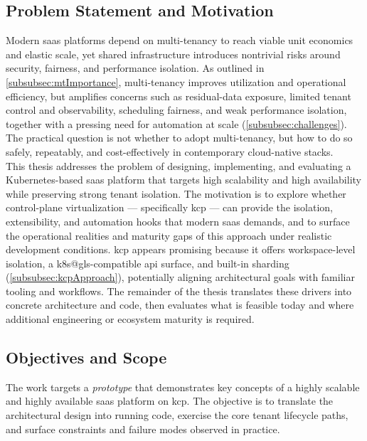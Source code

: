 \documentclass[11pt, a4paper, oneside, listof=totoc]{scrartcl}
\begin{document}
        \subsection{Problem Statement and Motivation}\label{subsec:problem}
            Modern \gls{saas} platforms depend on multi-tenancy to reach viable unit economics and
            elastic scale, yet shared infrastructure introduces nontrivial risks around security,
            fairness, and performance isolation.
            As outlined in \autoref{subsubsec:mtImportance}, multi-tenancy improves utilization and
            operational efficiency, but amplifies concerns such as residual-data exposure,
            limited tenant control and observability, scheduling fairness, and weak performance
            isolation, together with a pressing need for automation at scale
            (\autoref{subsubsec:challenges}).
            The practical question is not whether to adopt multi-tenancy, but how to do so safely,
            repeatably, and cost-effectively in contemporary cloud-native stacks.\\
            This thesis addresses the problem of designing, implementing, and evaluating a
            Kubernetes-based \gls{saas} platform that targets high scalability and high availability
            while preserving strong tenant isolation.
            The motivation is to explore whether control-plane virtualization --- specifically
            \gls{kcp} --- can provide the isolation, extensibility, and automation hooks that modern
            \gls{saas} demands, and to surface the operational realities and maturity gaps of this
            approach under realistic development conditions.
            \gls{kcp} appears promising because it offers workspace-level isolation, a
            \gls{k8s@gls}-compatible \gls{api} surface, and built-in sharding
            (\autoref{subsubsec:kcpApproach}), potentially aligning architectural goals with
            familiar tooling and workflows.
            The remainder of the thesis translates these drivers into concrete architecture and
            code, then evaluates what is feasible today and where additional engineering or
            ecosystem maturity is required.

        \subsection{Objectives and Scope}\label{subsec:objectivesAndScope}
            The work targets a \emph{prototype} that demonstrates key concepts of a highly scalable
            and highly available \gls{saas} platform on \gls{kcp}.
            The objective is to translate the architectural design into running code, exercise the
            core tenant lifecycle paths, and surface constraints and failure modes observed in
            practice.
\end{document}
